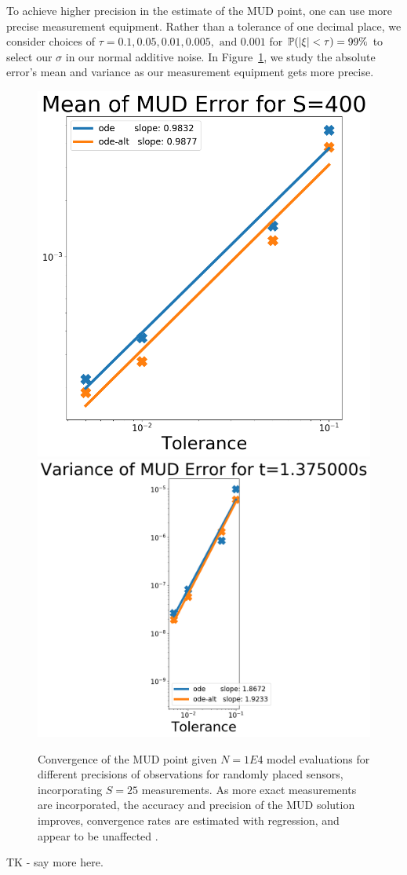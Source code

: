 To achieve higher precision in the estimate of the MUD point, one can use more precise measurement equipment.
Rather than a tolerance of one decimal place, we consider choices of $\tau = 0.1, 0.05, 0.01, 0.005, \text{ and } 0.001$ for $\mathbb{P}( \left\vert\xi\right\vert < \tau ) = 99\%$ to select our $\sigma$ in our normal additive noise.
In Figure~\ref{fig:ode-convergence-std}, we study the absolute error's mean and variance as our measurement equipment gets more precise.


\begin{figure}[htbp]
  \centering
  \includegraphics[width=0.475\linewidth]{figures/ode/ode_convergence_mud_std_mean}
  \includegraphics[width=0.475\linewidth]{figures/ode/ode_convergence_mud_std_var}

  \caption{Convergence of the MUD point given $N=1E4$ model evaluations for different precisions of observations for randomly placed sensors, incorporating $S=25$ measurements.
  As more exact measurements are incorporated, the accuracy and precision of the MUD solution improves, convergence rates are estimated with regression, and appear to be unaffected .
  }
  \label{fig:ode-convergence-std}
\end{figure}

TK - say more here.


